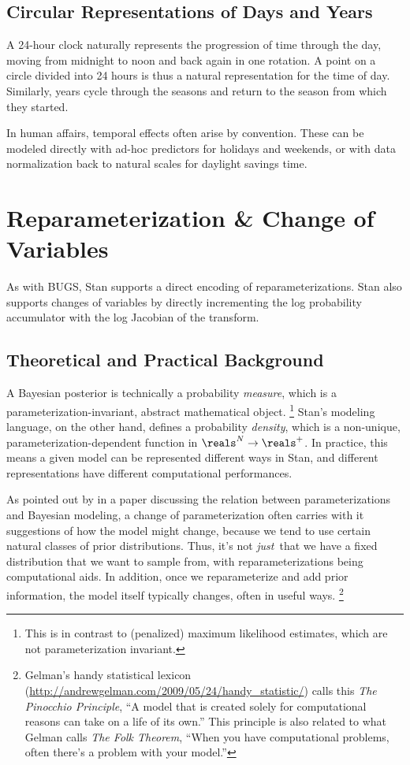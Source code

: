 \section{Circular Representations of Days and Years}

A 24-hour clock naturally represents the progression of time through
the day, moving from midnight to noon and back again in one rotation.
A point on a circle divided into 24 hours is thus a natural
representation for the time of day.  Similarly, years cycle through
the seasons and return to the season from which they started.

In human affairs, temporal effects often arise by convention.  These
can be modeled directly with ad-hoc predictors for holidays and
weekends, or with data normalization back to natural scales for
daylight savings time.


\chapter{Reparameterization \& Change of Variables}\label{change-of-variables.chapter}

\noindent
As with BUGS, Stan supports a direct encoding of reparameterizations.
Stan also supports changes of variables by directly incrementing the
log probability accumulator with the log Jacobian of the transform.

\section{Theoretical and Practical Background}

A Bayesian posterior is technically a probability \emph{measure},
which is a parameterization-invariant, abstract mathematical object.%
%
\footnote{This is in contrast to (penalized) maximum likelihood
  estimates, which are not parameterization invariant.}
%
Stan's modeling language, on the other hand, defines a probability
\emph{density}, which is a non-unique, parameterization-dependent
function in $\reals^N \rightarrow \reals^{+}$.  In practice, this
means a given model can be represented different ways in Stan, and
different representations have different computational performances.

As pointed out by \cite{Gelman:2004} in a paper discussing the
relation between parameterizations and Bayesian modeling, a change of
parameterization often carries with it suggestions of how the model
might change, because we tend to use certain natural classes of prior
distributions.  Thus, it's not \emph{just}\ that we have a fixed
distribution that we want to sample from, with reparameterizations
being computational aids.  In addition, once we reparameterize and add
prior information, the model itself typically changes, often in useful
ways.%
%
\footnote{Gelman's handy statistical lexicon
  (\url{http://andrewgelman.com/2009/05/24/handy_statistic/}) calls
  this \emph{The Pinocchio Principle}, ``A model that is created
  solely for computational reasons can take on a life of its own.''
  This principle is also related to what Gelman calls \emph{The Folk
    Theorem}, ``When you have computational problems, often there's a
  problem with your model.''}




